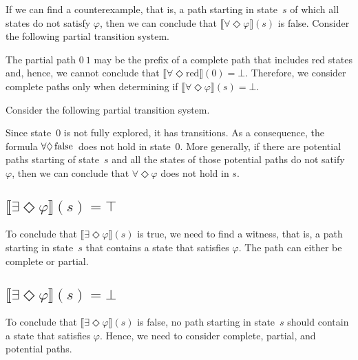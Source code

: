 \documentclass[12pt]{article}
\newcommand{\eventually}{\Diamond}
\newcommand{\FALSE}{\mbox{\lstinline{false}}}
\theoremstyle{definition}
\newcommand{\satisfaction}[1]{\llbracket #1 \rrbracket}
\newcommand{\bottom}{\mathord{\perp}}
\begin{document}
If we can find a counterexample, that is, a path starting in state~$s$ of which all states do not satisfy $\varphi$, then we can conclude that $\satisfaction{\forall \eventually \varphi}(s)$ is false.  Consider the following partial transition system.
\begin{center}
\end{center}
The partial path $0\ 1$ may be the prefix of a complete path that includes red states and, hence, we cannot conclude that $\satisfaction{\forall \eventually \mbox{red}}(0) = \bottom$.  Therefore, we consider complete paths only when determining if $\satisfaction{\forall \eventually \varphi}(s) = \bottom$.

Consider the following partial transition system.
\begin{center}
\end{center}
Since state~0 is not fully explored, it has transitions.  As a consequence, the formula $\forall \eventually \FALSE$ does not hold in state~0.  More generally, if there are potential paths starting of state~$s$ and all the states of those potential paths do not satify $\varphi$, then we can conclude that $\forall \eventually \varphi$ does not hold in $s$.

\subsection*{$\satisfaction{\exists \eventually \varphi}(s) = \top$}

To conclude that $\satisfaction{\exists \eventually \varphi}(s)$ is true, we need to find a witness, that is, a path starting in state~$s$ that contains a state that satisfies $\varphi$.  The path can either be complete or partial.

\subsection*{$\satisfaction{\exists \eventually \varphi}(s) = \bottom$}

To conclude that $\satisfaction{\exists \eventually \varphi}(s)$ is false, no path starting in state~$s$ should contain a state that satisfies $\varphi$.  Hence, we need to consider complete, partial, and potential paths.
\end{document}

